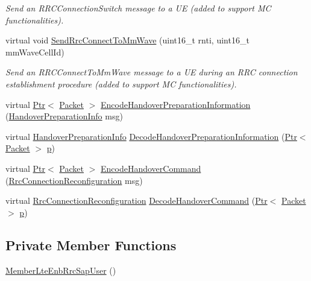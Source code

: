 \begin{DoxyCompactItemize}
\begin{DoxyCompactList}\small\item\em Send an {\itshape R\+R\+C\+Connection\+Switch} message to a UE (added to support MC functionalities). \end{DoxyCompactList}\item 
virtual void \hyperlink{classns3_1_1MemberLteEnbRrcSapUser_a9a943510d7c526a0384a2fe83f39df16}{Send\+Rrc\+Connect\+To\+Mm\+Wave} (uint16\+\_\+t rnti, uint16\+\_\+t mm\+Wave\+Cell\+Id)
\begin{DoxyCompactList}\small\item\em Send an {\itshape R\+R\+C\+Connect\+To\+Mm\+Wave} message to a UE during an R\+RC connection establishment procedure (added to support MC functionalities). \end{DoxyCompactList}\item 
virtual \hyperlink{classns3_1_1Ptr}{Ptr}$<$ \hyperlink{classns3_1_1Packet}{Packet} $>$ \hyperlink{classns3_1_1MemberLteEnbRrcSapUser_adb55209d98f53144e9179525b65fc768}{Encode\+Handover\+Preparation\+Information} (\hyperlink{structns3_1_1LteRrcSap_1_1HandoverPreparationInfo}{Handover\+Preparation\+Info} msg)
\item 
virtual \hyperlink{structns3_1_1LteRrcSap_1_1HandoverPreparationInfo}{Handover\+Preparation\+Info} \hyperlink{classns3_1_1MemberLteEnbRrcSapUser_a0c632e53d876d7201faf555581c16f6f}{Decode\+Handover\+Preparation\+Information} (\hyperlink{classns3_1_1Ptr}{Ptr}$<$ \hyperlink{classns3_1_1Packet}{Packet} $>$ \hyperlink{lte__link__budget__x2__handover__measures_8m_ac9de518908a968428863f829398a4e62}{p})
\item 
virtual \hyperlink{classns3_1_1Ptr}{Ptr}$<$ \hyperlink{classns3_1_1Packet}{Packet} $>$ \hyperlink{classns3_1_1MemberLteEnbRrcSapUser_afb070b01a08c30c41adaaa12b78773f2}{Encode\+Handover\+Command} (\hyperlink{structns3_1_1LteRrcSap_1_1RrcConnectionReconfiguration}{Rrc\+Connection\+Reconfiguration} msg)
\item 
virtual \hyperlink{structns3_1_1LteRrcSap_1_1RrcConnectionReconfiguration}{Rrc\+Connection\+Reconfiguration} \hyperlink{classns3_1_1MemberLteEnbRrcSapUser_a6fdbdd570a9488762698ba889ec07cfb}{Decode\+Handover\+Command} (\hyperlink{classns3_1_1Ptr}{Ptr}$<$ \hyperlink{classns3_1_1Packet}{Packet} $>$ \hyperlink{lte__link__budget__x2__handover__measures_8m_ac9de518908a968428863f829398a4e62}{p})
\end{DoxyCompactItemize}
\subsection*{Private Member Functions}
\begin{DoxyCompactItemize}
\item 
\hyperlink{classns3_1_1MemberLteEnbRrcSapUser_a18c2824780fa4f19d2f1dc026bbf394a}{Member\+Lte\+Enb\+Rrc\+Sap\+User} ()
\end{DoxyCompactItemize}
